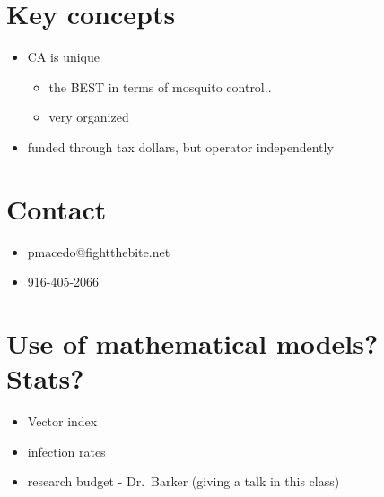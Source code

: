 \documentclass{article}
\begin{document}
    \section{Key concepts}
    \begin{itemize}
        \item CA is unique
        \begin{itemize}
            \item the BEST in terms of mosquito control..
            \item very organized
        \end{itemize}
        \item funded through tax dollars, but operator independently
    \end{itemize}

    \section{Contact}
    \begin{itemize}
        \item pmacedo@fightthebite.net
        \item 916-405-2066
    \end{itemize}

    \section{Use of mathematical models? Stats?}
    \begin{itemize}
        \item Vector index
        \item infection rates
        \item research budget - Dr.~Barker (giving a talk in this class)
    \end{itemize}
        
\end{document}
